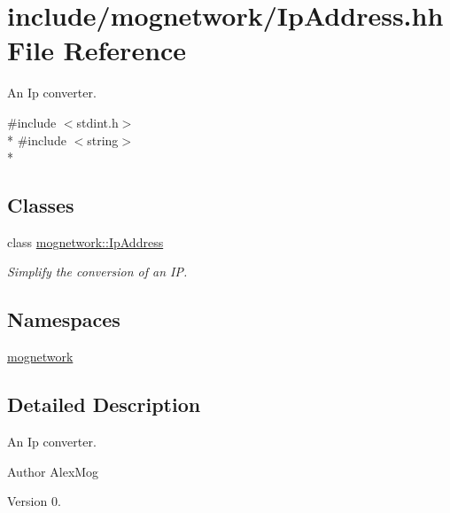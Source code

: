 \hypertarget{_ip_address_8hh}{\section{include/mognetwork/\-Ip\-Address.hh File Reference}
\label{_ip_address_8hh}
}


An Ip converter.  


{\ttfamily \#include $<$stdint.\-h$>$}\\*
{\ttfamily \#include $<$string$>$}\\*
\subsection*{Classes}
\begin{DoxyCompactItemize}
\item 
class \hyperlink{classmognetwork_1_1_ip_address}{mognetwork\-::\-Ip\-Address}
\begin{DoxyCompactList}\small\item\em Simplify the conversion of an I\-P. \end{DoxyCompactList}\end{DoxyCompactItemize}
\subsection*{Namespaces}
\begin{DoxyCompactItemize}
\item 
\hyperlink{namespacemognetwork}{mognetwork}
\end{DoxyCompactItemize}


\subsection{Detailed Description}
An Ip converter. \begin{DoxyAuthor}{Author}
Alex\-Mog 
\end{DoxyAuthor}
\begin{DoxyVersion}{Version}
0. 
\end{DoxyVersion}
